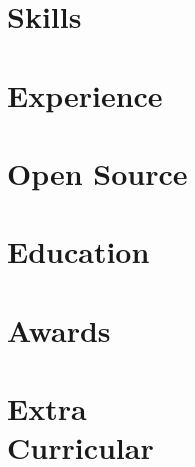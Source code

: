 \documentclass[a4paper]{resume}
\begin{document}
\def \sepspace {\vspace{1em}}
\makeheader{\contactphone}{\contactemail}{\contactwebsite}
\section{Skills}{\skillstechnical}
\section{Experience}{\experience}
\section{Open Source}{\projects}
\section{Education}{\education}
\section{Awards}{\awards}
\section{Extra\\Curricular}{\extracurricular}
\end{document}
